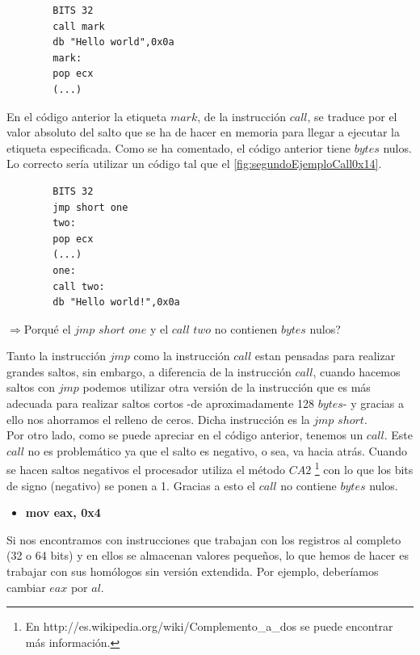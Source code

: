 \documentclass [titlepage, 12pt]{article}
\begin{document}
\lstset{language=[x86masm]Assembler,caption=Ejemplo de $byte$ nulo,label=fig:ejemploCall0x14}
\begin{lstlisting}	
		BITS 32
		call mark
		db "Hello world",0x0a
		mark:
		pop ecx
		(...)
\end{lstlisting}

En el c\'odigo anterior la etiqueta $mark$, de la instrucci\'on $call$, se traduce por el valor absoluto del salto que se ha de hacer en memoria para llegar a ejecutar la etiqueta especificada.
Como se ha comentado, el c\'odigo anterior tiene $bytes$ nulos. Lo correcto ser\'ia utilizar un c\'odigo tal que el  \ref{fig:segundoEjemploCall0x14}.

\lstset{language=[x86masm]Assembler,caption=Soluci\'on al $byte$ nulo,label=fig:segundoEjemploCall0x14}
\begin{lstlisting}	
		BITS 32
		jmp short one
		two:
		pop ecx
		(...)
		one:	
		call two:
		db "Hello world!",0x0a
\end{lstlisting}

\begin{math}\Rightarrow\end{math}Porqu\'e el $jmp$ $short$ $one$ y el $call$ $two$ no contienen $bytes$ nulos?\bigskip

Tanto la instrucci\'on $jmp$ como la instrucci\'on $call$ estan pensadas para realizar grandes saltos, sin embargo, a diferencia de la instrucci\'on $call$, cuando hacemos saltos con $jmp$ podemos utilizar otra versi\'on de la instrucci\'on que es m\'as adecuada para realizar saltos cortos -de aproximadamente 128 $bytes$- y gracias a ello nos ahorramos el relleno de ceros. Dicha instrucci\'on es la $jmp$ $short$.\\
Por otro lado, como se puede apreciar en el c\'odigo anterior, tenemos un $call$. Este $call$ no es problem\'atico ya que el salto es negativo, o sea, va hacia atr\'as. Cuando se hacen saltos negativos el procesador utiliza el m\'etodo $CA2$
\footnote{En http://es.wikipedia.org/wiki/Complemento\_a\_dos se puede encontrar m\'as informaci\'on.}  con lo que los bits de signo (negativo) se ponen a 1. Gracias a esto el $call$ no contiene $bytes$ nulos.

\begin{itemize}
	\item \textbf{mov eax, 0x4}
\end{itemize}
Si nos encontramos con instrucciones que trabajan con los registros al completo (32 o 64 bits) y en ellos se almacenan valores peque\~nos, lo que hemos de hacer es trabajar con sus hom\'ologos sin versi\'on extendida. Por ejemplo, deber\'iamos cambiar $eax$ por $al$.\bigskip
\end{document}
